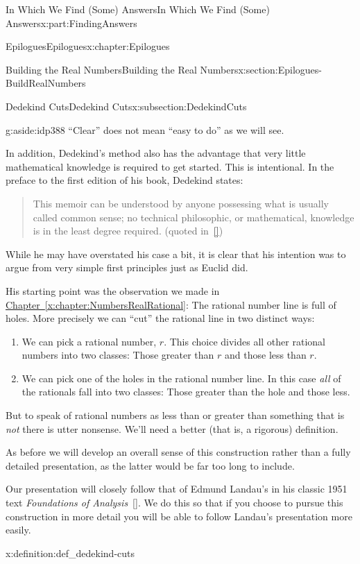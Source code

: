 \documentclass[oneside,10pt,]{book}
\newcommand{\xreffont}{\relax}
\numberwithin{equation}{section}
\begin{document}
\begin{partptx}{In Which We Find (Some) Answers}{}{In Which We Find (Some) Answers}{}{}{x:part:FindingAnswers}
\begin{chapterptx}{Epilogues}{}{Epilogues}{}{}{x:chapter:Epilogues}
\begin{sectionptx}{Building the Real Numbers}{}{Building the Real Numbers}{}{}{x:section:Epilogues-BuildRealNumbers}
\begin{subsectionptx}{Dedekind Cuts}{}{Dedekind Cuts}{}{}{x:subsection:DedekindCuts}
\begin{aside}{}{g:aside:idp388}%
``Clear'' does not mean ``easy to do'' as we will see.%
\end{aside}
In addition, Dedekind's method also has the advantage that very little mathematical knowledge is required to get started. This is intentional. In the preface to the first edition of his book, Dedekind  states:%
\begin{quote}%
This memoir can be understood by anyone possessing what is usually called common sense; no technical philosophic, or mathematical, knowledge is in the least degree required. (quoted in~\hyperlink{x:biblio:hawking05__god_creat_integ}{[{\xreffont 5}]})%
\end{quote}
While he may have overstated his case a bit, it is clear that his intention was to argue from very simple first principles just as Euclid did.%
\par
His starting point was the observation we made in \hyperref[x:chapter:NumbersRealRational]{Chapter~{\xreffont\ref{x:chapter:NumbersRealRational}}}: The rational number line is full of holes. More precisely we can ``cut'' the rational line in two distinct ways:%
\begin{enumerate}
\item{}We can pick a rational number, \(r\). This choice divides all other rational numbers into two classes: Those greater than \(r\) and those less than \(r\).%
\item{}We can pick one of the holes in the rational number line. In this case \emph{all} of the rationals fall into two classes: Those greater than the hole and those less.%
\end{enumerate}
%
\par
But to speak of rational numbers as less than or greater than something that is \emph{not} there is utter nonsense. We'll need a better (that is, a rigorous) definition.%
\par
As before we will develop an overall sense of this construction rather than a fully detailed presentation, as the latter would be far too long to include.%
\par
Our presentation will closely follow that of Edmund Landau's in his classic 1951 text \emph{Foundations of Analysis}~\hyperlink{x:biblio:landau66__found_analy}{[{\xreffont 7}]}. We do this so that if you choose to pursue this construction in more detail you will be able to follow Landau's presentation more easily.%
\begin{definition}{}{x:definition:def_dedekind-cuts}%

\end{definition}
\end{subsectionptx}
\end{sectionptx}
\end{chapterptx}
\end{partptx}
\end{document}
